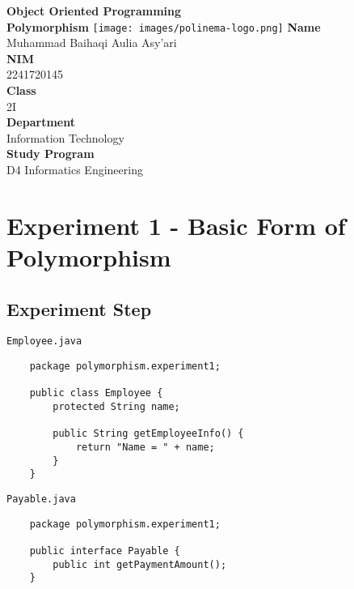 \documentclass[12pt,titlepage]{article}
\newcommand{\vSubject}{Object Oriented Programming}
\newcommand{\vSubtitle}{Polymorphism}
\newcommand{\vName}{Muhammad Baihaqi Aulia Asy'ari}
\newcommand{\vNIM}{2241720145}
\newcommand{\vClass}{2I}
\newcommand{\vDepartment}{Information Technology}
\newcommand{\vStudyProgram}{D4 Informatics Engineering}
\begin{document}
\begin{titlepage}
    \centering
    \vfill
    {\bfseries\LARGE
        \vSubject\\
        \vskip0.25cm
        \vSubtitle
    }
    \vfill
    \texttt{[image: images/polinema-logo.png]}
    \vfill
    {
        \textbf{Name}\\
        \vName\\
        \vskip0.5cm
        \textbf{NIM}\\
        \vNIM\\
        \vskip0.5cm
        \textbf{Class}\\
        \vClass\\
        \vskip0.5cm
        \textbf{Department}\\
        \vDepartment\\
        \vskip0.5cm
        \textbf{Study Program}\\
        \vStudyProgram
    }
\end{titlepage}

\newpage

\setcounter{section}{3}

\section{Experiment 1 - Basic Form of Polymorphism}
\subsection{Experiment Step}

\texttt{Employee.java}
\begin{verbatim}
    package polymorphism.experiment1;

    public class Employee {
        protected String name;

        public String getEmployeeInfo() {
            return "Name = " + name;
        }
    }
\end{verbatim}

\texttt{Payable.java}
\begin{verbatim}
    package polymorphism.experiment1;

    public interface Payable {
        public int getPaymentAmount();
    }
\end{verbatim}
\end{document}
